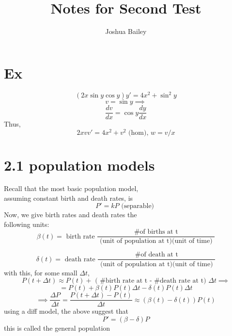\documentclass[10pt,a4paper]{article}
\begin{document}
\title{Notes for Second Test}
\author{Joshua Bailey}
\maketitle
\newpage

\section*{Ex}
  \[ (2x \sin y \cos y ) y' = 4x^2 + \sin^2y \]
  \[ v = \sin y \implies\]
  \[ \frac{dv}{dx} = \cos y \frac{dy}{dx} \]
  Thus, 
  \[ 2xvv' = 4x^2 + v^2 \text{ (hom),  } w = v/x \]

\section*{2.1 population models}
  Recall that the most basic population model, \\ 
  assuming constant birth and death rates, is 
  \[ P' = kP \text{ (separable)  } \]
  Now, we give birth rates and death rates the \\
  following units: 
  \[ \beta(t) = \text{ birth rate } \frac{ \text{ \# of births at t }}{
  \text{ (unit of population at t)(unit of time) }} \]

  \[ \delta(t) = \text{ death rate } \frac{ \text{ \# of death at t }}{
  \text{ (unit of population at t)(unit of time) }} \]
  with this, for some small \( \Delta t \), 
  \[ P(t + \Delta t) \approx P(t) + \text{ ( \# birth rate at t - \# death rate at t) } \Delta t \implies   \]
  \[ = P(t) + \beta (t) P(t) \Delta t - \delta (t) P(t) \Delta t \]
  \[ \implies \frac{ \Delta P}{ \Delta t} =  \frac{P(t + \Delta t) -P(t)}{ \Delta
  t}  \approx ( \beta(t) - \delta(t) ) P(t)  \]
  using a diff model, the above suggest that 
  \[ \boxed{ P' = (\beta - \delta ) P} \]
  this is called the general population 
\end{document}
